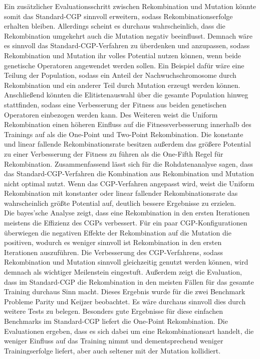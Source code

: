 Ein zusätzlicher Evaluationsschritt zwischen Rekombination und Mutation könnte somit das Standard-CGP sinnvoll erweitern, sodass Rekombinationserfolge erhalten bleiben.
Allerdings scheint es durchaus wahrscheinlich, dass die Rekombination umgekehrt auch die Mutation negativ beeinflusst.
Demnach wäre es sinnvoll das Standard-CGP-Verfahren zu überdenken und anzupassen, sodass Rekombination und Mutation ihr volles Potential nutzen können, wenn beide genetische Operatoren angewendet werden sollen.
Ein Beispiel dafür wäre eine Teilung der Population, sodass ein Anteil der Nachwuchschromosome durch Rekombination und ein anderer Teil durch Mutation erzeugt werden können.
Anschließend könnten die Elitistenauswahl über die gesamte Population hinweg stattfinden, sodass eine Verbesserung der Fitness aus beiden genetischen Operatoren einbezogen werden kann.
Des Weiteren weist die Uniform Rekombination einen höheren Einfluss auf die Fitnessverbesserung innerhalb des Trainings auf als die One-Point und Two-Point Rekombination.
Die konstante und linear fallende Rekombinationsrate besitzen außerdem das größere Potential zu einer Verbesserung der Fitness zu führen als die One-Fifth Regel für Rekombination.
Zusammenfassend lässt sich für die Rohdatenanalyse sagen, dass das Standard-CGP-Verfahren die Kombination aus Rekombination und Mutation nicht optimal nutzt.
Wenn das CGP-Verfahren angepasst wird, weist die Uniform Rekombination mit konstanter oder linear fallender Rekombinationsrate das wahrscheinlich größte Potential auf, deutlich bessere Ergebnisse zu erzielen.\\
Die bayes'sche Analyse zeigt, dass eine Rekombination in den ersten Iterationen meistens die Effizienz des CGPs verbessert.
Für ein paar CGP-Konfigurationen überwiegen die negativen Effekte der Rekombination auf die Mutation die positiven, wodurch es weniger sinnvoll ist Rekombination in den ersten Iterationen auszuführen.
Die Verbesserung des CGP-Verfahrens, sodass Rekombination und Mutation sinnvoll gleichzeitig genutzt werden können, wird demnach als wichtiger Meilenstein eingestuft.
Außerdem zeigt die Evaluation, dass im Standard-CGP die Rekombination in den meisten Fällen für das gesamte Training durchaus Sinn macht.
Dieses Ergebnis wurde für die zwei Benchmark Probleme Parity und Keijzer beobachtet.
Es wäre durchaus sinnvoll dies durch weitere Tests zu belegen.
Besonders gute Ergebnisse für diese einfachen Benchmarks im Standard-CGP liefert die One-Point Rekombination.
Die Evaluationen ergeben, dass es sich dabei um eine Rekombinationsart handelt, die weniger Einfluss auf das Training nimmt und dementsprechend weniger Trainingserfolge liefert, aber auch seltener mit der Mutation kollidiert.
